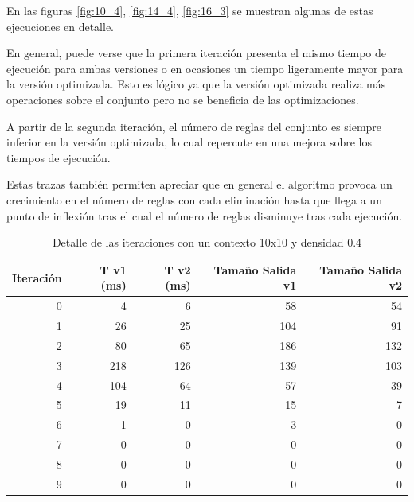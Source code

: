 	En las figuras \ref{fig:10_4}, \ref{fig:14_4}, \ref{fig:16_3}  se muestran algunas de estas ejecuciones en detalle.
	
	En general, puede verse que la primera iteración presenta el mismo tiempo de ejecución para ambas versiones o en ocasiones un tiempo ligeramente mayor para la versión optimizada. Esto es lógico ya que la versión optimizada realiza más operaciones sobre el conjunto pero no se beneficia de las optimizaciones.
	
	A partir de la segunda iteración, el número de reglas del conjunto es siempre inferior en la versión optimizada, lo cual repercute en una mejora sobre los tiempos de ejecución.
	
	Estas trazas también permiten apreciar que en general el algoritmo provoca un crecimiento en el número de reglas con cada eliminación hasta que llega a un punto de inflexión tras el cual el número de reglas disminuye tras cada ejecución. 
	
	\begin{table}[h]
		\caption{Detalle de las iteraciones con un contexto 10x10 y densidad 0.4}
		\begin{center}
			\begin{tabular}{|r|r|r|r|r|}
				\hline 
				Iteración  & T v1 (ms) & T v2 (ms) & Tamaño Salida v1  & Tamaño Salida v2  \\ \hline \hline
				0 & 4 & 6 & 58 & 54 \\ \hline
				1 & 26 & 25 & 104 & 91 \\ \hline
				2 & 80 & 65 & 186 & 132 \\ \hline
				3 & 218 & 126 & 139 & 103 \\ \hline
				4 & 104 & 64 & 57 & 39 \\ \hline
				5 & 19 & 11 & 15 & 7 \\ \hline
				6 & 1 & 0 & 3 & 0 \\ \hline
				7 & 0 & 0 & 0 & 0 \\ \hline
				8 & 0 & 0 & 0 & 0 \\ \hline
				9 & 0 & 0 & 0 & 0 \\ \hline
			\end{tabular}
		\end{center}
		\label{iteraciones10d4}
	\end{table}


